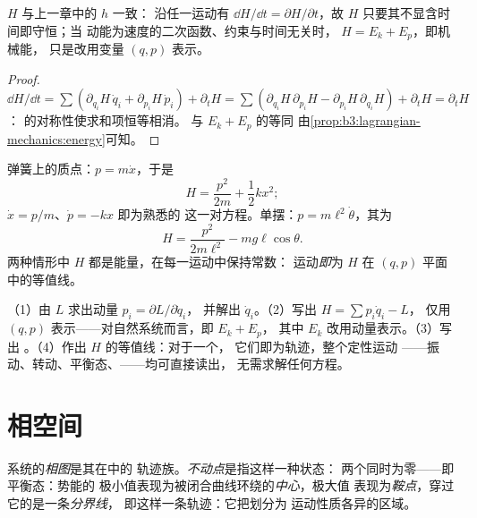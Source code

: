 \begin{proposition}[$H$ 的意义]\label{prop:b3:hamiltonian-mechanics:energy}
$H$ 与上一章中的 $h$ 一致：
沿任一运动有 $\dd H/\dd t = \partial H/\partial t$，故 $H$
只要其不显含时间即守恒；当
动能为速度的二次函数、约束与时间无关时，
$H = E_k + E_p$，即机械能，
只是改用变量 $(q, p)$ 表示。
\end{proposition}

\begin{proof}
$\dd H/\dd t = \sum(\partial_{q_i}H\,\dot q_i + \partial_{p_i}H\,\dot
p_i) + \partial_tH = \sum(\partial_{q_i}H\,\partial_{p_i}H -
\partial_{p_i}H\,\partial_{q_i}H) + \partial_tH = \partial_tH$：
的对称性使求和项恒等相消。
与 $E_k + E_p$ 的等同
由\cref{prop:b3:lagrangian-mechanics:energy}可知。
\end{proof}

\begin{example}[两个哈密顿量]\label{ex:b3:hamiltonian-mechanics:examples}
弹簧上的质点：$p = m\dot x$，于是
\[
H = \frac{p^2}{2m} + \frac12 kx^2 ;
\]
 $\dot x = p/m$、$\dot p = -kx$ 即为熟悉的
这一对方程。单摆：$p = m\ell^2\dot\theta$，其为
\[
H = \frac{p^2}{2m\ell^2} - mg\ell\cos\theta .
\]
两种情形中 $H$ 都是能量，在每一运动中保持常数：
运动\emph{即}为 $H$ 在 $(q,p)$ 平面中的等值线。
\end{example}

\begin{method}[哈密顿方法]\label{met:b3:hamiltonian-mechanics:recipe}
（1）由 $L$ 求出动量 $p_i = \partial L/\partial\dot q_i$，
并解出 $\dot q_i$。（2）写出 $H = \sum p_i\dot q_i - L$，
仅用 $(q, p)$ 表示——对自然系统而言，即 $E_k + E_p$，
其中 $E_k$ 改用动量表示。（3）写出
。（4）作出 $H$ 的等值线：对于一个，
它们即为轨迹，整个定性运动
——振动、转动、平衡态、——均可直接读出，
无需求解任何方程。
\end{method}

\section{相空间}

\begin{definition}[相图、不动点与分界线]\label{def:b3:hamiltonian-mechanics:portrait}
系统的\emph{相图}是其在中的
轨迹族。\emph{不动点}是指这样一种状态：
两个同时为零——即平衡态：势能的
极小值表现为被闭合曲线环绕的\emph{中心}，极大值
表现为\emph{鞍点}，穿过它的是一条\emph{分界线}，
即这样一条轨迹：它把划分为
运动性质各异的区域。
\end{definition}

